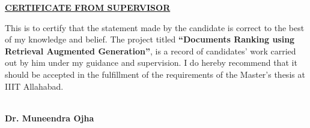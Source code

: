 
\begin{center}
{\underline{\bf\Large CERTIFICATE FROM SUPERVISOR }}\\
\par\vspace{5mm}
\end{center}
\noindent This is to certify that the statement made by the candidate is correct to the best of my knowledge and belief. The project titled \textbf{“Documents Ranking using Retrieval Augmented Generation”}, is a record of
candidates’ work carried out by him under my guidance and supervision. I do hereby recommend that it
should be accepted in the fulfillment of the requirements of the Master’s thesis at IIIT Allahabad.

\vspace{35mm}
\begin{flushright}
        \textbf{}\\
        \vspace{5mm}
	\textbf{Dr. Muneendra Ojha}\\
\end{flushright}